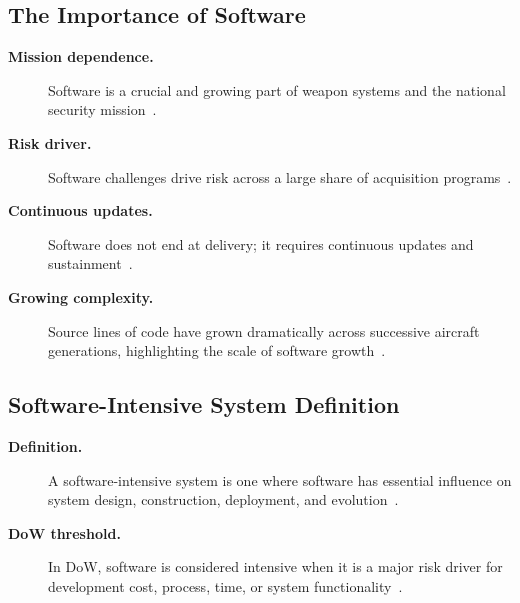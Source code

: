 \documentclass[../main.tex]{subfiles}
\begin{document}
\subsection{The Importance of Software}
\begin{description}
  \item[\textbf{Mission dependence.}] Software is a crucial and growing part of weapon systems and the national security mission~\autocite{edo-3-4-1-software-acquisition-environment-2025}.
  \item[\textbf{Risk driver.}] Software challenges drive risk across a large share of acquisition programs~\autocite{edo-3-4-1-software-acquisition-environment-2025}.
  \item[\textbf{Continuous updates.}] Software does not end at delivery; it requires continuous updates and sustainment~\autocite{edo-3-4-1-software-acquisition-environment-2025}.
  \item[\textbf{Growing complexity.}] Source lines of code have grown dramatically across successive aircraft generations, highlighting the scale of software growth~\autocite{edo-3-4-1-software-acquisition-environment-2025}.
\end{description}

\subsection{Software-Intensive System Definition}
\begin{description}
  \item[\textbf{Definition.}] A software-intensive system is one where software has essential influence on system design, construction, deployment, and evolution~\autocite{edo-3-4-1-software-acquisition-environment-2025}.
  \item[\textbf{DoW threshold.}] In DoW, software is considered intensive when it is a major risk driver for development cost, process, time, or system functionality~\autocite{edo-3-4-1-software-acquisition-environment-2025}.
\end{description}
\end{document}
